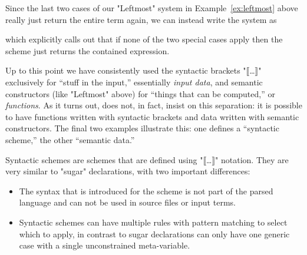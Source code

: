 \documentclass[11pt]{article} %
\begin{document}
\begin{notation}
\begin{enumerate}

\end{enumerate}
\end{notation}

\begin{example}
  Since the last two cases of our "Leftmost" system in Example~\ref{ex:leftmost} above really just
  return the entire term again, we can instead write the system as
  which explicitly calls out that if none of the two special cases apply then the scheme just
  returns the contained expression.
\end{example}

Up to this point we have consistently used the syntactic brackets "⟦…⟧" exclusively for ``stuff in
the input,'' essentially \emph{input data}, and semantic constructors (like "Leftmost" above) for
``things that can be computed,'' or \emph{functions}. As it turns out, \HAX does not, in fact,
insist on this separation: it is possible to have functions written with syntactic brackets and data
written with semantic constructors.  The final two examples illustrate this: one defines a
``syntactic scheme,'' the other ``semantic data.''

Syntactic schemes are schemes that are defined using "⟦…⟧" notation. They are very similar to
"sugar" declarations, with two important differences:
\begin{itemize}

\item The syntax that is introduced for the scheme is not part of the parsed language and can not be
  used in source files or input terms.

\item Syntactic schemes can have multiple rules with pattern matching to select which to apply, in
  contrast to sugar declarations can only have one generic case with a single unconstrained
  meta-variable.

\end{itemize}
\end{document}

